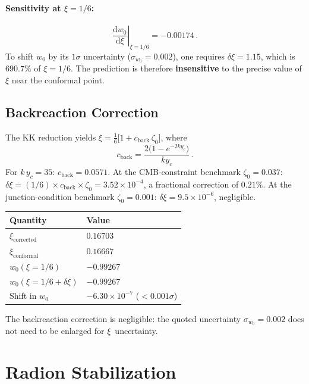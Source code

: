 \paragraph{Sensitivity at $\xi = 1/6$:}
\begin{equation}
  \left.\frac{\mathrm{d}w_0}{\mathrm{d}\xi}\right|_{\xi=1/6} = -0.00174\,.
\end{equation}
To shift $w_0$ by its $1\sigma$ uncertainty ($\sigma_{w_0} = 0.002$), one requires $\delta\xi = 1.15$, which is $690.7\%$ of $\xi = 1/6$. The prediction is therefore \textbf{insensitive} to the precise value of $\xi$ near the conformal point.

\subsection{Backreaction Correction}

The KK reduction yields $\xi = \frac{1}{6}\bigl[1 + c_{\mathrm{back}}\,\zeta_0\bigr]$, where
\begin{equation}
  c_{\mathrm{back}} = \frac{2\bigl(1 - e^{-2ky_c}\bigr)}{ky_c}\,.
\end{equation}
For $k\,y_c = 35$: $c_{\mathrm{back}} = 0.0571$. At the CMB-constraint benchmark $\zeta_0 = 0.037$: $\delta\xi = (1/6) \times c_{\mathrm{back}} \times \zeta_0 = 3.52 \times 10^{-4}$, a fractional correction of $0.21\%$. At the junction-condition benchmark $\zeta_0 = 0.001$: $\delta\xi = 9.5 \times 10^{-6}$, negligible.

\begin{center}
\begin{tabular}{l l}
\hline
Quantity & Value \\
\hline
$\xi_{\mathrm{corrected}}$ & $0.16703$ \\
$\xi_{\mathrm{conformal}}$ & $0.16667$ \\
$w_0(\xi = 1/6)$ & $-0.99267$ \\
$w_0(\xi = 1/6 + \delta\xi)$ & $-0.99267$ \\
Shift in $w_0$ & $-6.30 \times 10^{-7}$ ($< 0.001\sigma$) \\
\hline
\end{tabular}
\end{center}

\noindent
The backreaction correction is negligible: the quoted uncertainty $\sigma_{w_0} = 0.002$ does not need to be enlarged for $\xi$~uncertainty.


\section{Radion Stabilization}
\label{app:radion}


